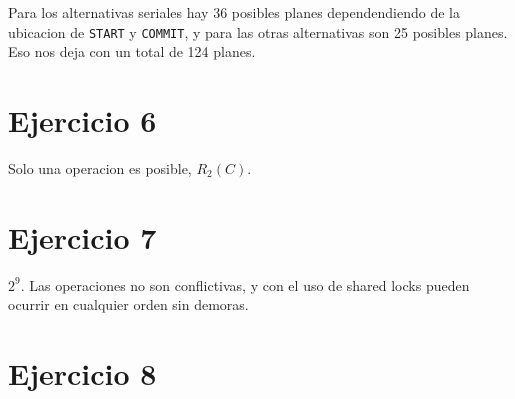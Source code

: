 \documentclass[11pt,a4paper,titlepage,leqno]{article}
\newcommand{\ejercicio}[1]{
    \section*{Ejercicio #1}
    \setcounter{answer}{0}
}
\newcounter{answer}
\begin{document}
Para los alternativas seriales hay 36 posibles planes dependendiendo de la ubicacion de \texttt{START} y \texttt{COMMIT}, y para las otras alternativas son 25 posibles planes. Eso nos deja con un total de 124 planes.

\ejercicio{6}

Solo una operacion es posible, $R_2(C)$.

\ejercicio{7}

$2^9$. Las operaciones no son conflictivas, y con el uso de shared locks pueden ocurrir en cualquier orden sin demoras.

\ejercicio{8}
\end{document}
